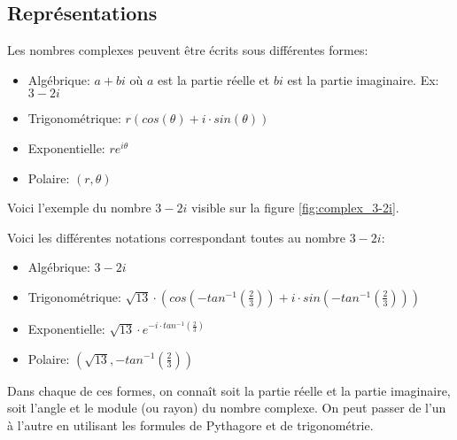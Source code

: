 \subsection{Représentations}
\label{sec:complex_representations}

Les nombres complexes peuvent être écrits sous différentes formes:
\begin{itemize}
    \item Algébrique: $a + bi$ où $a$ est la partie réelle et $bi$ est la partie imaginaire. Ex: $3 - 2i$
    \item Trigonométrique: $r(cos(\theta) + i \cdot sin(\theta))$
    \item Exponentielle: $re^{i\theta}$
    \item Polaire: $(r, \theta)$
\end{itemize}

Voici l'exemple du nombre $3 - 2i$ visible sur la figure \ref{fig:complex_3-2i}.

\begin{minipage}{\linewidth}
\label{fig:complex_3-2i}
\end{minipage}

Voici les différentes notations correspondant toutes au nombre $3 - 2i$:
\begin{itemize}
    \item Algébrique: $3 - 2i$
    \item Trigonométrique: $\sqrt{13} \cdot (cos(-tan^{-1}(\frac{2}{3})) + i \cdot sin(-tan^{-1}(\frac{2}{3})))$
    \item Exponentielle: $\sqrt{13} \cdot e^{-i \cdot tan^{-1}(\frac{2}{3})}$
    \item Polaire: $(\sqrt{13}, -tan^{-1}(\frac{2}{3}))$
\end{itemize}

Dans chaque de ces formes, on connaît soit la partie réelle et la partie imaginaire, soit l'angle et le module (ou rayon) du nombre complexe. On peut passer de l'un à l'autre en utilisant les formules de Pythagore et de trigonométrie. 
